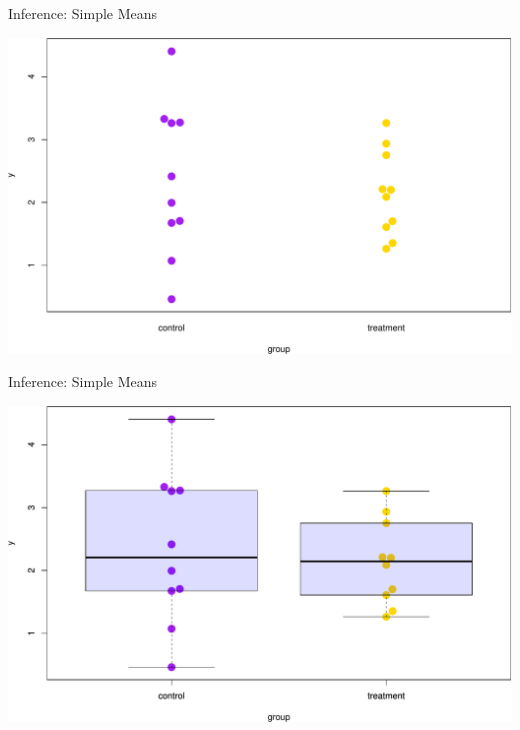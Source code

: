\documentclass[ignorenonframetext,]{beamer}
\begin{document}
\begin{frame}{Inference: Simple Means}
\protect\hypertarget{inference-simple-means}{}

\includegraphics{biostats_I_files/figure-beamer/unnamed-chunk-3-1.pdf}

\end{frame}

\begin{frame}{Inference: Simple Means}
\protect\hypertarget{inference-simple-means-1}{}

\includegraphics{biostats_I_files/figure-beamer/unnamed-chunk-4-1.pdf}

\end{frame}
\end{document}
